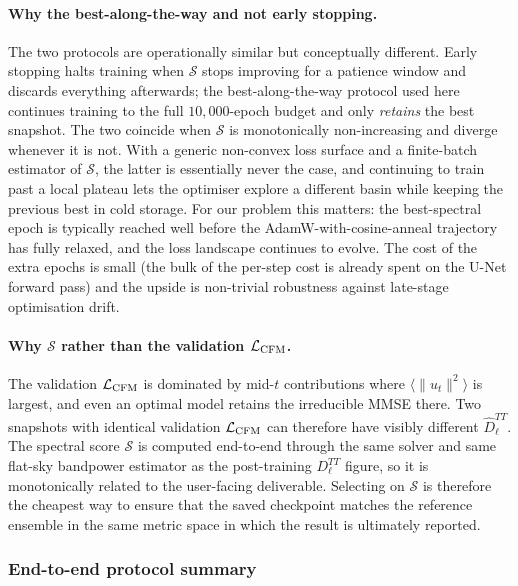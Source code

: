 \documentclass[11pt]{article}
\theoremstyle{definition}
\begin{document}
\paragraph{Why the best-along-the-way and not early stopping.}
The two protocols are operationally similar but conceptually different. Early stopping halts training when $\mathcal S$ stops improving for a patience window and discards everything afterwards; the best-along-the-way protocol used here continues training to the full $10{,}000$-epoch budget and only \emph{retains} the best snapshot. The two coincide when $\mathcal S$ is monotonically non-increasing and diverge whenever it is not. With a generic non-convex loss surface and a finite-batch estimator of $\mathcal S$, the latter is essentially never the case, and continuing to train past a local plateau lets the optimiser explore a different basin while keeping the previous best in cold storage. For our problem this matters: the best-spectral epoch is typically reached well before the AdamW-with-cosine-anneal trajectory has fully relaxed, and the loss landscape continues to evolve. The cost of the extra epochs is small (the bulk of the per-step cost is already spent on the U-Net forward pass) and the upside is non-trivial robustness against late-stage optimisation drift.

\paragraph{Why $\mathcal S$ rather than the validation $\mathcal L_{\rm CFM}$.}
The validation $\mathcal L_{\rm CFM}$ is dominated by mid-$t$ contributions where $\langle\|u_t\|^2\rangle$ is largest, and even an optimal model retains the irreducible MMSE there. Two snapshots with identical validation $\mathcal L_{\rm CFM}$ can therefore have visibly different $\hat D_\ell^{TT}$. The spectral score $\mathcal S$ is computed end-to-end through the same solver and same flat-sky bandpower estimator as the post-training $D_\ell^{TT}$ figure, so it is monotonically related to the user-facing deliverable. Selecting on $\mathcal S$ is therefore the cheapest way to ensure that the saved checkpoint matches the reference ensemble in the same metric space in which the result is ultimately reported.

\subsubsection{End-to-end protocol summary}
\end{document}
